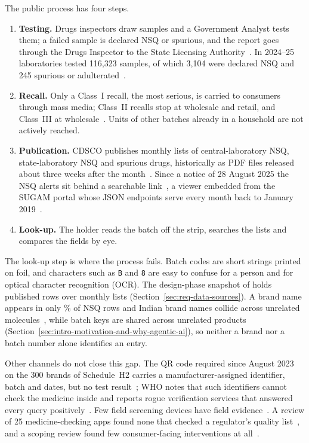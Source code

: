 The public process has four steps.
\begin{enumerate}[leftmargin=*,itemsep=1pt]
  \item \textbf{Testing.} Drugs inspectors draw samples and a Government Analyst tests them; a failed sample is declared NSQ or spurious, and the report goes through the Drugs Inspector to the State Licensing Authority~\cite{cdsco2024recall}. In 2024--25 laboratories tested 116,323 samples, of which 3,104 were declared NSQ and 245 spurious or adulterated~\cite{roy2025fiveyears}.
  \item \textbf{Recall.} Only a Class~I recall, the most serious, is carried to consumers through mass media; Class~II recalls stop at wholesale and retail, and Class~III at wholesale~\cite{cdsco2024recall}. Units of other batches already in a household are not actively reached.
  \item \textbf{Publication.} CDSCO publishes monthly lists of central-laboratory NSQ, state-laboratory NSQ and spurious drugs, historically as PDF files released about three weeks after the month~\cite{cdsco2026latestalerts}. Since a notice of 28 August 2025 the NSQ alerts sit behind a searchable link~\cite{cdsco2025nsqlink}, a viewer embedded from the SUGAM portal whose JSON endpoints serve every month back to January 2019~\cite{cdsco2026nsqpage,cdsco2026portal}.
  \item \textbf{Look-up.} The holder reads the batch off the strip, searches the lists and compares the fields by eye.
\end{enumerate}

The look-up step is where the process fails. Batch codes are short strings printed on foil, and characters such as \texttt{B} and \texttt{8} are easy to confuse for a person and for optical character recognition (OCR). The design-phase snapshot of \SnapshotDate{} holds \NumAlertRows{} published rows over \NumMonths{} monthly lists (Section~\ref{sec:req-data-sources}). A brand name appears in only \BrandPresentPct\% of NSQ rows and Indian brand names collide across unrelated molecules~\cite{neelakantan2024lookalike}, while batch keys are shared across unrelated products (Section~\ref{sec:intro-motivation-and-why-agentic-ai}), so neither a brand nor a batch number alone identifies an entry.

Other channels do not close this gap. The QR code required since August 2023 on the 300 brands of Schedule~H2 carries a manufacturer-assigned identifier, batch and dates, but no test result~\cite{cdsco2023faqqr}; WHO notes that such identifiers cannot check the medicine inside and reports rogue verification services that answered every query positively~\cite{who2021traceability}. Few field screening devices have field evidence~\cite{vickers2018field,kovacs2014technologies}. A review of 25 medicine-checking apps found none that checked a regulator's quality list~\cite{ciapponi2021mobile}, and a scoping review found few consumer-facing interventions at all~\cite{pal2025assessing}.

